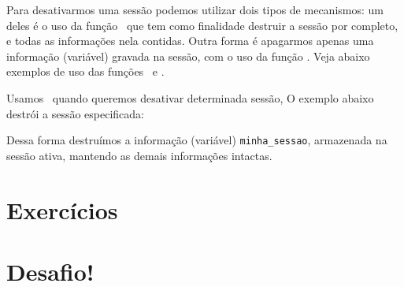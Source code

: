 Para desativarmos uma sessão podemos utilizar dois tipos de mecanismos: um deles é o uso da função 
\funcaosessiondestroy~que tem como finalidade destruir a sessão por completo, e todas as informações 
nela contidas. Outra forma é apagarmos apenas uma informação (variável) gravada na sessão, 
com o uso da função \funcaounset. Veja abaixo exemplos de uso das funções \funcaosessiondestroy~e
\funcaounset.



Usamos \funcaounset~quando queremos desativar determinada sessão, O exemplo abaixo destrói a 
sessão especificada:



Dessa forma destruímos a informação (variável) \texttt{minha\_sessao}, armazenada na sessão 
ativa, mantendo as demais informações intactas.


\section{Exercícios}
\label{cap10-exercicios}

\section{Desafio!}
\label{cap10-desafio}